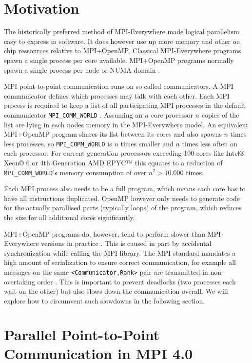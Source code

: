 \documentclass[sigconf]{acmart}
\begin{document}
\section{Motivation}
The historically preferred method of MPI-Everywhere made logical parallelism easy to express in software.
It does however use up more memory and other on chip ressources relative to MPI+OpenMP.
Classical MPI-Everywhere programs spawn a single process per core available.
MPI+OpenMP programs normally spawn a single process per node or NUMA domain \cite{zambreLessonsLearned2022}.

MPI point-to-point communication runs on so called communicators.
A MPI communicator defines which processes may talk with each other.
Each MPI process is required to keep a list of all participating MPI processes in the default communicator \verb|MPI_COMM_WORLD| \cite{mpi40}.
Assuming an $n$ core processor $n$ copies of the list are lying in each nodes memory in the MPI-Everywhere model.
An equivalent MPI+OpenMP program shares its list between its cores and also spawns $n$ times less processes, so \verb|MPI_COMM_WORLD| is $n$ times smaller and $n$ times less often on each processor.
For current generation processors exceeding 100 cores like Intel® Xeon® 6 \cite{intelXeon6} or 4th Generation AMD EPYC™ \cite{amd4thGenEpyc} this equates to a reduction of \verb|MPI_COMM_WORLD|'s memory consumption of over $n^2 > 10.000$ times.

Each MPI process also needs to be a full program, which means each core has to have all instructions duplicated.
OpenMP however only needs to generate code for the actually parallised parts (typically loops) of the program, which reduces the size for all additional cores significantly.

MPI+OpenMP programs do, however, tend to perform slower than MPI-Everywhere versions in practice \cite{zambreLessonsLearned2022}.
This is caused in part by accidental synchronization while calling the MPI library.
The MPI standard mandates a high amount of serialization to ensure correct communication, for example all messages on the same \verb|<Communicator,Rank>| pair are transmitted in non-overtaking order \cite{mpi40}.
This is important to prevent deadlocks (two processes each wait on the other) but also slows down the communication overall.
We will explore how to circumvent such slowdowns in the following section.


\section{Parallel Point-to-Point Communication in MPI 4.0}
\end{document}
